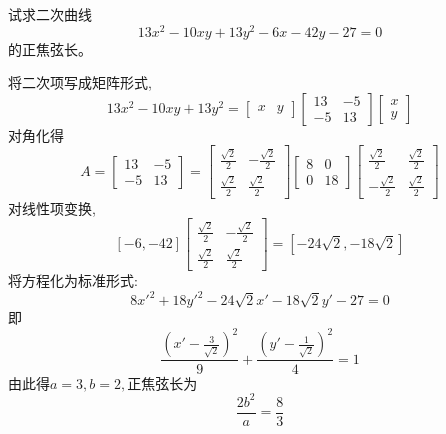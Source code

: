 \begin{questions}
    \question 试求二次曲线
    \[
    13x^{2} - 10xy + 13y^{2} - 6x - 42y - 27 = 0
    \]
    的正焦弦长。
    \begin{solution}
        将二次项写成矩阵形式,
        \[
        13x^{2} - 10xy + 13y^{2} = 
        \begin{bmatrix} x & y \end{bmatrix}
        \begin{bmatrix} 13 & -5 \\ -5 & 13 \end{bmatrix}
        \begin{bmatrix} x \\ y \end{bmatrix}
        \]
        对角化得
        \[
        A = \begin{bmatrix} 13 & -5 \\ -5 & 13 \end{bmatrix} =
        \begin{bmatrix} \frac{\sqrt{2}}{2} & -\frac{\sqrt{2}}{2} \\[6pt] \frac{\sqrt{2}}{2} & \frac{\sqrt{2}}{2} \end{bmatrix}
        \begin{bmatrix} 8 & 0 \\ 0 & 18 \end{bmatrix}
        \begin{bmatrix} \frac{\sqrt{2}}{2} & \frac{\sqrt{2}}{2} \\[6pt] -\frac{\sqrt{2}}{2} & \frac{\sqrt{2}}{2} \end{bmatrix}
        \]
        对线性项变换,
        \[
        [-6, -42]
        \begin{bmatrix} \frac{\sqrt{2}}{2} & -\frac{\sqrt{2}}{2} \\[6pt] \frac{\sqrt{2}}{2} & \frac{\sqrt{2}}{2} \end{bmatrix}
        = [-24\sqrt{2}, -18\sqrt{2}]
        \]
        将方程化为标准形式:
        \[
        8x'^2 + 18y'^2 - 24\sqrt{2} x' - 18\sqrt{2} y' - 27 = 0
        \]
        即
        \[
        \frac{\left(x' - \frac{3}{\sqrt{2}}\right)^2}{9} + \frac{\left(y' - \frac{1}{\sqrt{2}}\right)^2}{4} = 1
        \]
        由此得$a = 3, b = 2,$正焦弦长为
        \[
        \frac{2b^2}{a} = \frac{8}{3}
        \]
    \end{solution}


\end{questions}

